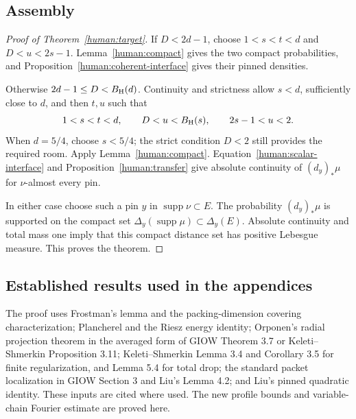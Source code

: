 \documentclass[11pt]{article}
\theoremstyle{definition}\newtheorem{remark}[theorem]{Remark}
\newcommand{\supp}{\operatorname{supp}}\newcommand{\dist}{\operatorname{dist}}
\begin{document}
\subsection{Assembly}
\begin{proof}[Proof of Theorem~\ref{human:target}]
If \(D<2d-1\), choose \(1<s<t<d\) and \(D<u<2s-1\).
Lemma~\ref{human:compact} gives the two compact probabilities, and
Proposition~\ref{human:coherent-interface} gives their pinned densities.

Otherwise \(2d-1\le D<B_{\rm H}(d)\). Continuity and strictness allow
\(s<d\), sufficiently close to \(d\), and then \(t,u\) such that
\[
 1<s<t<d,\qquad D<u<B_{\rm H}(s),\qquad 2s-1<u<2.
\]
When \(d=5/4\), choose \(s<5/4\); the strict condition \(D<2\) still
provides the required room. Apply Lemma~\ref{human:compact}.
Equation~\eqref{human:scalar-interface} and
Proposition~\ref{human:transfer} give absolute continuity of
\((d_y)_*\mu\) for \(\nu\)-almost every pin.

In either case choose such a pin \(y\) in \(\supp\nu\subset E\).
The probability \((d_y)_*\mu\) is supported on the compact set
\(\Delta_y(\supp\mu)\subset\Delta_y(E)\). Absolute continuity and total
mass one imply that this compact distance set has positive Lebesgue measure.
This proves the theorem.
\end{proof}

\subsection{Established results used in the appendices}
The proof uses Frostman's lemma and the packing-dimension covering
characterization; Plancherel and the Riesz energy identity; Orponen's radial
projection theorem in the averaged form of GIOW Theorem 3.7 or
Keleti--Shmerkin Proposition 3.11; Keleti--Shmerkin Lemma 3.4 and Corollary 3.5
for finite regularization, and Lemma 5.4 for total drop; the standard packet
localization in GIOW Section 3 and Liu's Lemma 4.2; and Liu's pinned quadratic
identity. These inputs are cited where used. The new profile bounds and
variable-chain Fourier estimate are proved here.

\clearpage
\appendix

\clearpage

\clearpage


\end{document}
